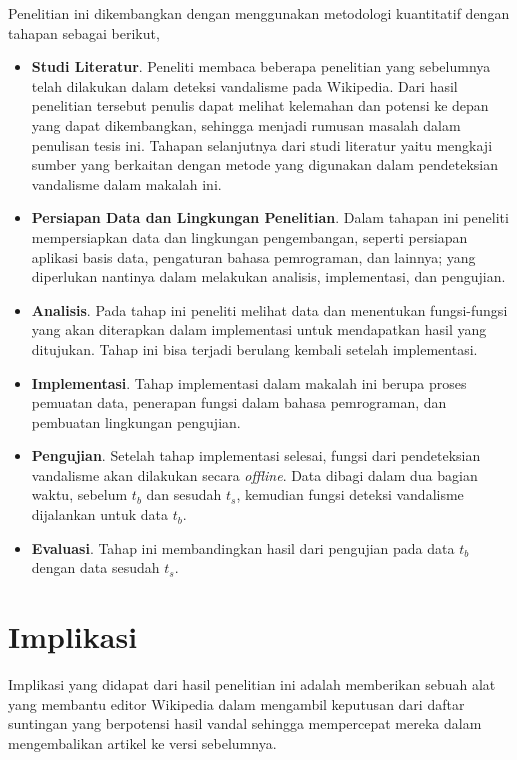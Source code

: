 \documentclass[12pt,a4paper,titlepage]{article}
\begin{document}
Penelitian ini dikembangkan dengan menggunakan metodologi kuantitatif dengan tahapan sebagai berikut,
\begin{itemize}
	\item \textbf{Studi Literatur}. Peneliti membaca beberapa penelitian yang sebelumnya telah dilakukan dalam deteksi vandalisme pada Wikipedia.
Dari hasil penelitian tersebut penulis dapat melihat kelemahan dan potensi ke depan yang dapat dikembangkan, sehingga menjadi rumusan masalah dalam penulisan tesis ini.
Tahapan selanjutnya dari studi literatur yaitu mengkaji sumber yang berkaitan dengan metode yang digunakan dalam pendeteksian vandalisme dalam makalah ini.
	\item \textbf{Persiapan Data dan Lingkungan Penelitian}.
Dalam tahapan ini peneliti mempersiapkan data dan lingkungan pengembangan, seperti persiapan aplikasi basis data, pengaturan bahasa pemrograman, dan lainnya; yang diperlukan nantinya dalam melakukan analisis, implementasi, dan pengujian.
	\item \textbf{Analisis}.
Pada tahap ini peneliti melihat data dan menentukan fungsi-fungsi yang akan diterapkan dalam implementasi untuk
mendapatkan hasil yang ditujukan.
Tahap ini bisa terjadi berulang kembali setelah implementasi.
	\item \textbf{Implementasi}.
Tahap implementasi dalam makalah ini berupa proses pemuatan data, penerapan fungsi dalam bahasa pemrograman, dan
pembuatan lingkungan pengujian.
	\item \textbf{Pengujian}.
Setelah tahap implementasi selesai, fungsi dari pendeteksian vandalisme akan dilakukan secara \textit{offline}.
Data dibagi dalam dua bagian waktu, sebelum $ t_{b} $ dan sesudah $ t_{s} $, kemudian fungsi deteksi vandalisme dijalankan untuk data $t_{b}$.
	\item \textbf{Evaluasi}. Tahap ini membandingkan hasil dari pengujian pada data $t_{b}$ dengan data sesudah $t_{s}$.
\end{itemize}

\section{Implikasi}\label{sec:implikasi}

Implikasi yang didapat dari hasil penelitian ini adalah memberikan sebuah alat yang membantu editor Wikipedia dalam mengambil keputusan dari daftar suntingan yang berpotensi hasil vandal sehingga mempercepat mereka dalam mengembalikan
artikel ke versi sebelumnya.
\end{document}
